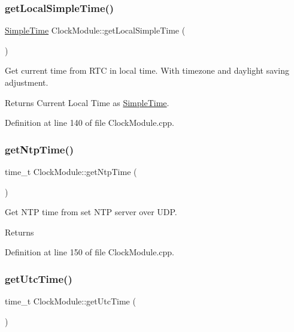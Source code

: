 \subsubsection{\texorpdfstring{getLocalSimpleTime()}{getLocalSimpleTime()}}
{\footnotesize\ttfamily \mbox{\hyperlink{class_simple_time}{Simple\+Time}} Clock\+Module\+::get\+Local\+Simple\+Time (\begin{DoxyParamCaption}{ }\end{DoxyParamCaption})}

Get current time from R\+TC in local time. With timezone and daylight saving adjustment. \begin{DoxyReturn}{Returns}
Current Local Time as \mbox{\hyperlink{class_simple_time}{Simple\+Time}}. 
\end{DoxyReturn}


Definition at line 140 of file Clock\+Module.\+cpp.

\mbox{\label{class_clock_module_a4e1dc771d7467c2bd5e9c7885231982e}} 
\subsubsection{\texorpdfstring{getNtpTime()}{getNtpTime()}}
{\footnotesize\ttfamily time\+\_\+t Clock\+Module\+::get\+Ntp\+Time (\begin{DoxyParamCaption}{ }\end{DoxyParamCaption})\hspace{0.3cm}{\ttfamily [private]}}

Get N\+TP time from set N\+TP server over U\+DP. \begin{DoxyReturn}{Returns}

\end{DoxyReturn}


Definition at line 150 of file Clock\+Module.\+cpp.

\mbox{\label{class_clock_module_af0faab0171ded0fdb37dcbff757f451e}} 
\subsubsection{\texorpdfstring{getUtcTime()}{getUtcTime()}}
{\footnotesize\ttfamily time\+\_\+t Clock\+Module\+::get\+Utc\+Time (\begin{DoxyParamCaption}{ }\end{DoxyParamCaption})}

